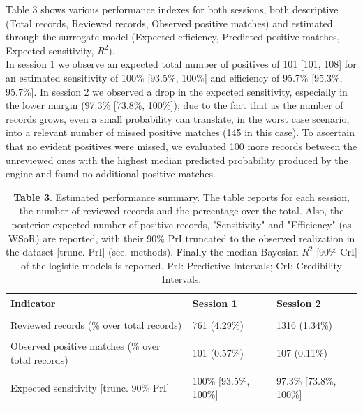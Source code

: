 \documentclass{article}
\begin{document}
Table 3 shows various performance indexes for both sessions, both
descriptive (Total records, Reviewed records, Observed positive matches)
and estimated through the surrogate model (Expected efficiency,
Predicted positive matches, Expected sensitivity, \(R^2\)).\\
In session 1 we observe an expected total number of positives of 101
{[}101, 108{]} for an estimated sensitivity of 100\% {[}93.5\%, 100\%{]}
and efficiency of 95.7\% {[}95.3\%, 95.7\%{]}. In session 2 we observed
a drop in the expected sensitivity, especially in the lower margin
(97.3\% {[}73.8\%, 100\%{]}), due to the fact that as the number of
records grows, even a small probability can translate, in the worst case
scenario, into a relevant number of missed positive matches (145 in this
case). To ascertain that no evident positives were missed, we evaluated
100 more records between the unreviewed ones with the highest median
predicted probability produced by the engine and found no additional
positive matches.\\

\begin{table}[!h]

\caption{\label{tab:Table 3}\textbf{Table 3}. Estimated performance summary. The table reports for each session, the number of reviewed records and the percentage over the total. Also, the posterior expected number of positive records, "Sensitivity" and "Efficiency" (as WSoR) are reported, with their 90\% PrI truncated to the observed realization in the dataset [trunc. PrI] (see. methods). Finally the median Bayesian $R^2$ [90\% CrI] of the logistic models is reported. PrI: Predictive Intervals; CrI: Credibility Intervals.}
\centering
\begin{tabular}[t]{lll}
\toprule
Indicator & Session 1 & Session 2\\
\midrule
\cellcolor{gray!6}{Total records} & \cellcolor{gray!6}{17755} & \cellcolor{gray!6}{98371}\\
Reviewed records (\% over total records) & 761 (4.29\%) & 1316 (1.34\%)\\
\cellcolor{gray!6}{Expected efficiency (over random) [trunc. 90\% PrI]} & \cellcolor{gray!6}{95.7\% [95.3\%, 95.7\%]} & \cellcolor{gray!6}{98.6\% [98.2\%, 98.7\%]}\\
Observed positive matches (\% over total records) & 101 (0.57\%) & 107 (0.11\%)\\
\cellcolor{gray!6}{Predicted positive matches [trunc. 90\% PrI]} & \cellcolor{gray!6}{101 [101, 108]} & \cellcolor{gray!6}{110 [107, 145]}\\
\addlinespace
Expected sensitivity [trunc. 90\% PrI] & 100\% [93.5\%, 100\%] & 97.3\% [73.8\%, 100\%]\\
\cellcolor{gray!6}{Simple Model $R^2$ [90\% CrI]} & \cellcolor{gray!6}{98.1\% [97.4\%, 98.3\%]} & \cellcolor{gray!6}{98.2\% [97.6\%, 98.3\%]}\\
\bottomrule
\end{tabular}
\end{table}
\end{document}
